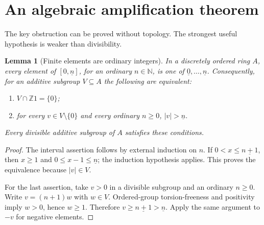 \documentclass[11pt]{article}
\numberwithin{equation}{section}
\newtheorem{lemma}[lemma]{Lemma}
\theoremstyle{definition}
\theoremstyle{remark}
\newcommand{\N}{\mathbb N}
\newcommand{\Z}{\mathbb Z}
\newcommand{\std}[1]{\underline{#1}}
\begin{document}
\section{An algebraic amplification theorem}
\label{pma:lc:sec:amplification}

The key obstruction can be proved without topology. The strongest useful
hypothesis is weaker than divisibility.

\begin{lemma}[Finite elements are ordinary integers]\label{pma:lc:lem:finite}
In a discretely ordered ring $A$, every element of $[0,\std n]$, for an
ordinary $n\in\N$, is one of $\std0,\ldots,\std n$. Consequently, for
an additive subgroup $V\subseteq A$ the following are equivalent:
\begin{enumerate}
\item $V\cap\Z1=\{0\}$;
\item for every $v\in V\setminus\{0\}$ and every ordinary $n\ge0$,
      $|v|>\std n$.
\end{enumerate}
Every divisible additive subgroup of $A$ satisfies these conditions.
\end{lemma}
\begin{proof}
The interval assertion follows by external induction on $n$. If $0<x\le
\std{n+1}$, then $x\ge1$ and $0\le x-1\le\std n$; the induction
hypothesis applies. This proves the equivalence because $|v|\in V$.

For the last assertion, take $v>0$ in a divisible subgroup and an ordinary
$n\ge0$. Write $v=(n+1)w$ with $w\in V$. Ordered-group torsion-freeness
and positivity imply $w>0$, hence $w\ge1$. Therefore $v\ge\std{n+1}>
\std n$. Apply the same argument to $-v$ for negative elements.
\end{proof}
\end{document}
